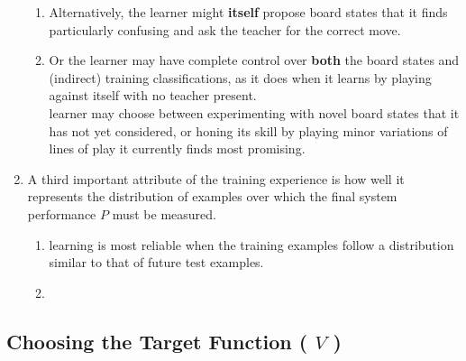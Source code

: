 \begin{enumerate}
\begin{enumerate}
        \item Alternatively, the learner might \textbf{itself} propose board states that it finds particularly confusing and ask the teacher for the correct move.
        \hfill \cite{ml/book/Machine-Learning/Tom-M-Mitchell}

        \item Or the learner may have complete control over \textbf{both} the board states and (indirect) training classifications, as it does when it learns by playing against itself with no teacher present.
        \hfill \cite{ml/book/Machine-Learning/Tom-M-Mitchell}
        \\
        learner may choose between experimenting with novel board states that it has not yet considered, or honing its skill by playing minor variations of lines of play it currently finds most promising.
        \hfill \cite{ml/book/Machine-Learning/Tom-M-Mitchell}
    \end{enumerate}

    \item A third important attribute of the training experience is how well it represents the distribution of examples over which the final system performance $P$ must be measured.
    \hfill \cite{ml/book/Machine-Learning/Tom-M-Mitchell}
    \begin{enumerate}
        \item learning is most reliable when the training examples follow a distribution similar to that of future test examples.
        \hfill \cite{ml/book/Machine-Learning/Tom-M-Mitchell}

        \item 
        \hfill \cite{ml/book/Machine-Learning/Tom-M-Mitchell}
    \end{enumerate}
\end{enumerate}




\subsection{Choosing the Target Function ( $V$ ) }

